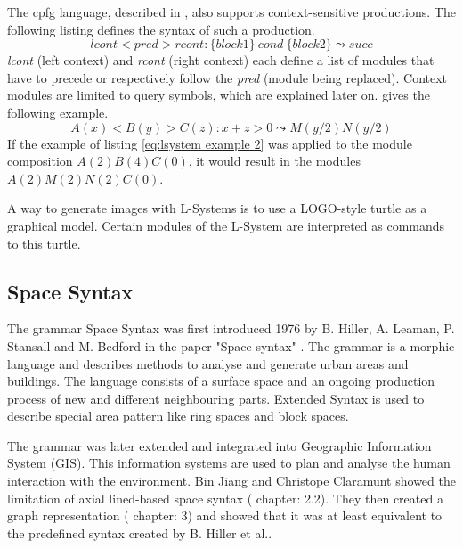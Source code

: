 \documentclass[11pt, a4paper]{report}
\begin{document}
The cpfg language, described in \citep{PrusinkiewiczEtAl:2001}, also supports context-sensitive productions. The following listing defines the syntax of such a production.
\begin{equation} \label{eq:lsystem context sensitive}
    lcont < pred > rcont : \{block1\}\ cond\ \{block2\} \leadsto succ
\end{equation}
\textit{lcont} (left context) and \textit{rcont} (right context) each define a list of modules that have to precede or respectively follow the \textit{pred} (module being replaced). Context modules are limited to query symbols, which are explained later on. \citep{PrusinkiewiczEtAl:2001} gives the following example.
\begin{equation} \label{eq:lsystem example 2}
    A(x) < B(y) > C(z) : x + z > 0 \leadsto M(y / 2)N(y / 2)
\end{equation}
If the example of listing \ref{eq:lsystem example 2} was applied to the module composition $A(2)B(4)C(0)$, it would result in the modules $A(2)M(2)N(2)C(0)$.

A way to generate images with L-Systems is to use a LOGO-style turtle as a graphical model. Certain modules of the L-System are interpreted as commands to this turtle.

\pagebreak
\subsection{Space Syntax}
The grammar Space Syntax was first introduced 1976 by B. Hiller, A. Leaman, P. Stansall and M. Bedford in the paper "Space syntax" \citep{spaceSyntax:1976}. The grammar is a morphic language and describes methods to analyse and generate urban areas and buildings.
The language consists of a surface space and an ongoing production process of new and different neighbouring parts. Extended Syntax is used to describe special area pattern like ring spaces and block spaces.

The grammar was later extended and integrated into Geographic Information System (GIS). This information systems are used to plan and analyse the human interaction with the environment. 
Bin Jiang and Christope Claramunt \citep{integrationSpaceSyntaxGIS:2002} showed the limitation of axial lined-based space syntax (\citep{integrationSpaceSyntaxGIS:2002} chapter: 2.2). They then created a graph representation (\citep{integrationSpaceSyntaxGIS:2002} chapter: 3) and showed that it was at least equivalent to the predefined syntax created by B. Hiller et al.\citep{spaceSyntax:1976}.
\end{document}
